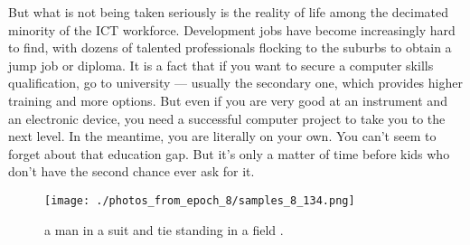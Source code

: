 \documentclass{article}%
\begin{document}
But what is not being taken seriously is the reality of life among the decimated minority of the ICT workforce. Development jobs have become increasingly hard to find, with dozens of talented professionals flocking to the suburbs to obtain a jump job or diploma. It is a fact that if you want to secure a computer skills qualification, go to university — usually the secondary one, which provides higher training and more options. But even if you are very good at an instrument and an electronic device, you need a successful computer project to take you to the next level. In the meantime, you are literally on your own.\newline%
You can’t seem to forget about that education gap. But it’s only a matter of time before kids who don’t have the second chance ever ask for it.\newline%

%


\begin{figure}[h!]%
\centering%
\texttt{[image: ./photos\_from\_epoch\_8/samples\_8\_134.png]}%
\caption{a man in a suit and tie standing in a field .}%
\end{figure}

%
\end{document}
